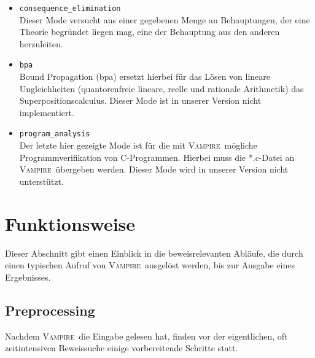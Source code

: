 \documentclass{article}
\newcommand{\vampire}{\textsc{Vampire}~}
\begin{document}
\begin{itemize}
\begin{itemize}
	\item \verb|consequence_elimination| \\
	Dieser Mode versucht aus einer gegebenen Menge an Behauptungen, der eine Theorie begründet liegen mag, eine der Behauptung aus den anderen herzuleiten.
	\item \verb|bpa| \\
	Bound Propagation (bpa) ersetzt hierbei für das Lösen von lineare Ungleichheiten (quantorenfreie lineare, reelle und rationale Arithmetik) das Superpositionscalculus.
	Dieser Mode ist in unserer Version nicht implementiert.
	\item \verb|program_analysis| \\
	Der letzte hier gezeigte Mode ist für die mit \vampire mögliche Programmverifikation von C-Programmen. Hierbei muss die *.c-Datei an \vampire übergeben werden.
	Dieser Mode wird in unserer Version nicht unterstützt.
\end{itemize}

\end{itemize} %



\section{Funktionsweise}
\label{sec:mechanics}

Dieser Abschnitt gibt einen Einblick in die beweisrelevanten Abläufe, die durch einen typischen Aufruf von \vampire ausgelöst werden, bis zur Ausgabe eines Ergebnisses.

\subsection{Preprocessing}
\label{subsec:preprocessing}

Nachdem \vampire die Eingabe gelesen hat, finden vor der eigentlichen, oft zeitintensiven
Beweissuche einige vorbereitende Schritte statt.
\end{document}
